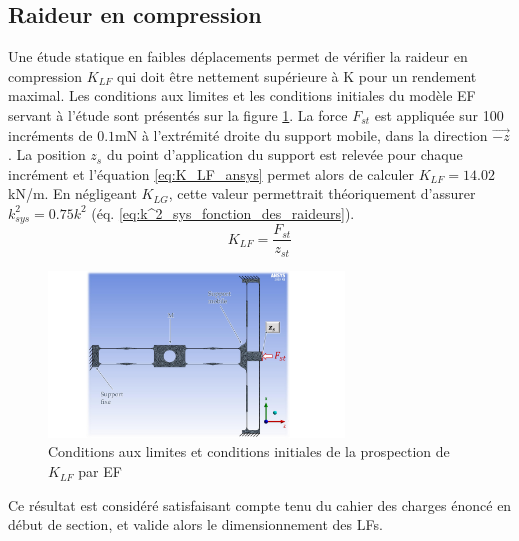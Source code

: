 	\subsection{Raideur en compression}
	\label{sec:3.3.1a_Raideur en compression}
Une étude statique en faibles déplacements permet de vérifier la raideur en compression $K_{LF}$ qui doit être nettement supérieure à K pour un rendement maximal. Les conditions aux limites et les conditions initiales du modèle EF servant à l'étude sont présentés sur la figure \ref{fig:ANSYS_Conditions_Initiales_K_LF}. La force $F_{st}$ est appliquée sur 100 incréments de $0.1$mN à l'extrémité droite du support mobile, dans la direction $\vec{-z}$. La position $z_s$ du point d'application du support est relevée pour chaque incrément et l'équation \ref{eq:K_LF_ansys} permet alors de calculer $K_{LF}=14.02$kN/m. En négligeant $K_{LG}$, cette valeur permettrait théoriquement d'assurer $k^2_{sys} = 0.75k^2$ (éq. \ref{eq:k^2_sys_fonction_des_raideurs}). 
\begin{equation}
	K_{LF} = \dfrac{F_{st}}{z_{st}}
	\label{eq:K_LF_ansys}
\end{equation}
\begin{figure}[!htbp]
	\begin{center}
		\captionsetup{justification=centering}
		\includegraphics[trim={4.5cm 0cm 6.5cm 0cm},clip, width=0.7\textwidth]{../Chap3/Figure/ANSYS_Conditions_Initiales_K_LF.pdf}
		\caption{Conditions aux limites et conditions initiales de la prospection de $K_{LF}$ par EF}
		\label{fig:ANSYS_Conditions_Initiales_K_LF}
	\end{center}
\end{figure}

Ce résultat est considéré satisfaisant compte tenu du cahier des charges énoncé en début de section, et valide alors le dimensionnement des LFs.

